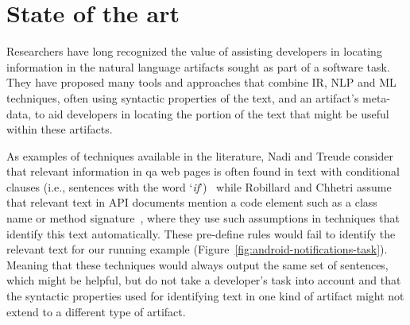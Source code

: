 \section{State of the art}
\label{cp1:novelty}


Researchers have long recognized the value of 
assisting developers in locating information in the natural language artifacts sought as part of a software task.
They have proposed many tools and approaches 
that combine \acf{IR}, \acf{NLP} and \acf{ML} techniques,
often using  syntactic properties of the text, and an artifact's meta-data,
to aid developers in locating the portion of the text that
might be useful within these artifacts.






As examples of techniques available in the literature, Nadi and Treude consider 
that relevant information in \acs{qa} 
web pages is often found in text with
conditional clauses (i.e., sentences with the word `\textit{if}')~\cite{nadi2020}
while Robillard and Chhetri assume that relevant 
text in API documents mention a code element such as a class name or method signature~\cite{Robillard2015},
where they use such assumptions 
in techniques that identify this text automatically.
These pre-define rules would fail to identify the relevant text for our running example
(Figure~\ref{fig:android-notifications-task}).
Meaning that these techniques would always output the same set of sentences, 
which might be helpful, but do not take a developer's task into account
and that the syntactic properties used for identifying text in one kind of artifact
might not extend to a different type of artifact.





